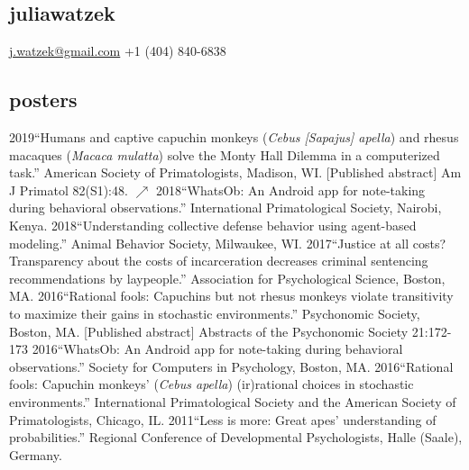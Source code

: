 \documentclass[]{friggeri-cv}
\begin{document}
\begin{aside}
  \section{{\normalfont julia}watzek}
    \href{mailto:j.watzek@gmail.com}{j.watzek@gmail.com}
    +1 (404) 840-6838
\end{aside}



\subsection{posters}

\begin{entrylist2}
  \entrytwo
    {2019}{``Humans and captive capuchin monkeys (\emph{Cebus [Sapajus] apella}) and rhesus macaques (\emph{Macaca mulatta}) solve the Monty Hall Dilemma in a computerized task.'' American Society of Primatologists, Madison, WI. [Published abstract] Am J Primatol 82(S1):48. \href{https://doi.org/10.1002/ajp.23114}{\small $\nearrow$}}
  \entrytwo
    {2018}{``WhatsOb: An Android app for note-taking during behavioral observations.'' International Primatological Society, Nairobi, Kenya.}
  \entrytwo
    {2018}{``Understanding collective defense behavior using agent-based modeling.'' Animal Behavior Society, Milwaukee, WI.}
  \entrytwo
    {2017}{``Justice at all costs? Transparency about the costs of incarceration decreases criminal sentencing recommendations by laypeople.'' Association for Psychological Science, Boston, MA.}
\entrytwo
    {2016}{``Rational fools: Capuchins but not rhesus monkeys violate transitivity to maximize their gains in stochastic environments.'' Psychonomic Society, Boston, MA. [Published abstract] Abstracts of the Psychonomic Society 21:172-173}
  \entrytwo
    {2016}{``WhatsOb: An Android app for note-taking during behavioral observations.'' Society for Computers in Psychology, Boston, MA.}
  \entrytwo
    {2016}{``Rational fools: Capuchin monkeys' (\emph{Cebus apella}) (ir)rational choices in stochastic environments.'' International Primatological Society and the American Society of Primatologists, Chicago, IL.}
  \entrytwo
    {2011}{``Less is more: Great apes' understanding of probabilities.'' Regional Conference of Developmental Psychologists, Halle (Saale), Germany.}
\end{entrylist2}

\end{document}
